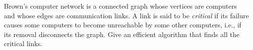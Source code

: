 Brown's computer network is a connected graph whose vertices are
computers and whose edges are communication links.  A link is said to
be {\em critical} if its failure causes some computers to become
unreachable by some other computers, i.e., if its removal disconnects
the graph.  Give an efficient algorithm that finds all the critical links.
